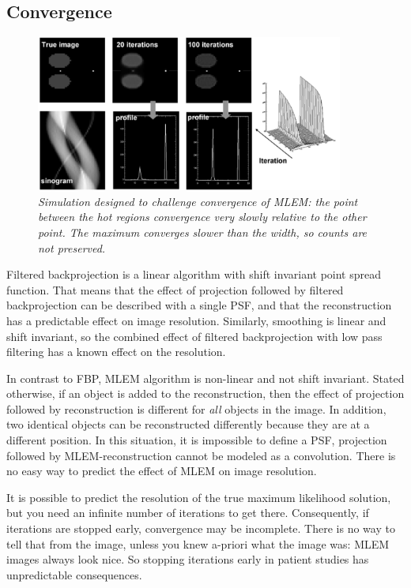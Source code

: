 \subsection{Convergence} \label{sec:mlemconverge}
\begin{figure}[tb]
\centering
\includegraphics[width=0.9\textwidth]{figs/fig_mlem_converge.pdf}
\caption{\label{fig:mlem_converge} \emph{Simulation designed to challenge
convergence of MLEM: the point between the hot regions convergence very slowly
relative to the other point. The maximum converges slower than the width, so
counts are not preserved.}}
\end{figure}
%
Filtered backprojection is a linear algorithm with shift invariant point
spread function. That means that the effect of projection followed by filtered
backprojection can be described with a single PSF, and that the reconstruction
has a predictable effect on image resolution. Similarly, smoothing is linear
and shift invariant, so the combined effect of filtered backprojection with
low pass filtering has a known effect on the resolution.

In contrast to FBP, MLEM algorithm is non-linear and not shift invariant.
Stated otherwise, if an object is added to the reconstruction, then the effect
of projection followed by reconstruction is different for {\em all} objects in
the image. In addition, two identical objects can be reconstructed differently
because they are at a different position. In this situation, it is impossible
to define a PSF, projection followed by MLEM-reconstruction cannot be modeled
as a convolution. There is no easy way to predict the effect of MLEM on image
resolution. 

It is possible to predict the resolution of the true maximum likelihood
solution, but you need an infinite number of iterations to get
there. Consequently, if iterations are stopped early, convergence may be
incomplete. There is no way to tell that from the image, unless you knew
a-priori what the image was: MLEM images always look nice. So stopping
iterations early in patient studies has unpredictable consequences.

